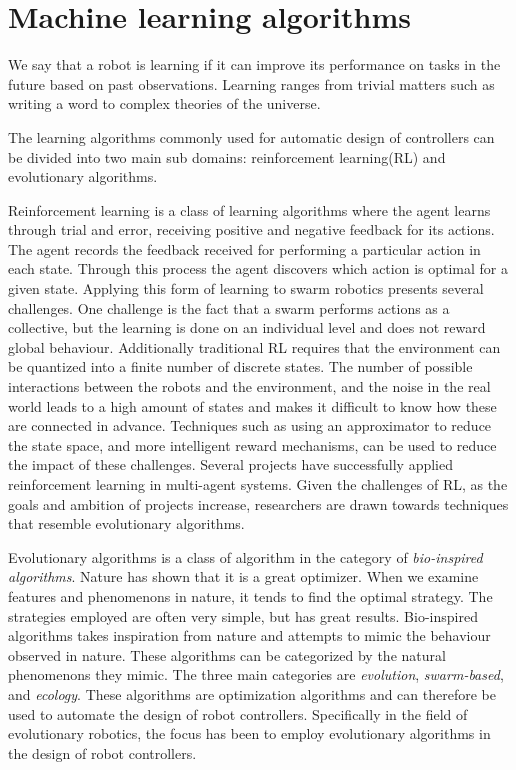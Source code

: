 \section{Machine learning algorithms}
\label{sec:learning}
We say that a robot is learning if it can improve its performance on tasks in the future based on past observations.
Learning ranges from trivial matters such as writing a word to complex theories of the universe.

The learning algorithms commonly used for automatic design of controllers can be divided into two main sub domains: reinforcement learning(RL) and evolutionary algorithms\cite{brambilla_swarm_2013}.

Reinforcement learning is a class of learning algorithms where the agent learns through trial and error, receiving positive and negative feedback for its actions\cite{brambilla_swarm_2013}.
The agent records the feedback received for performing a particular action in each state.
Through this process the agent discovers which action is optimal for a given state.
Applying this form of learning to swarm robotics presents several challenges.
One challenge is the fact that a swarm performs actions as a collective, but the learning is done on an individual level and does not reward global behaviour\cite{brambilla_swarm_2013}.
Additionally traditional RL requires that the environment can be quantized into a finite number of discrete states\cite{schmidhuber_evolutionary_2000}\cite{brambilla_swarm_2013}.
The number of possible interactions between the robots and the environment, and the noise in the real world leads to a high amount of states and makes it difficult to know how these are connected in advance\cite{schmidhuber_evolutionary_2000}.
Techniques such as using an approximator\cite{brambilla_swarm_2013} to reduce the state space, and more intelligent reward mechanisms\cite{brambilla_swarm_2013}, can be used to reduce the impact of these challenges.
Several projects\cite{li_learning_2004}\cite{balch_behavioral_1998}\cite{mataric_interaction_1994} have successfully applied reinforcement learning in multi-agent systems.
Given the challenges of RL, as the goals and ambition of projects increase, researchers are drawn towards techniques that resemble evolutionary algorithms\cite{schmidhuber_evolutionary_2000}.


Evolutionary algorithms is a class of algorithm in the category of \emph{bio-inspired algorithms}\cite{binitha_survey_2012}.
Nature has shown that it is a great optimizer.
When we examine features and phenomenons in nature, it tends to find the optimal strategy.
The strategies employed are often very simple, but has great results.
Bio-inspired algorithms takes inspiration from nature and attempts to mimic the behaviour observed in nature.
These algorithms can be categorized by the natural phenomenons they mimic.
The three main categories are \emph{evolution}, \emph{swarm-based}, and \emph{ecology}\cite{binitha_survey_2012}. 
These algorithms are optimization algorithms and can therefore be used to automate the design of robot controllers.
Specifically in the field of evolutionary robotics, the focus has been to employ evolutionary algorithms in the design of robot controllers.

